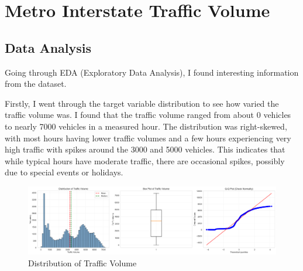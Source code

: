 \documentclass[12pt]{article}
\begin{document}
\section{Metro Interstate Traffic Volume}

\subsection{Data Analysis}

Going through EDA (Exploratory Data Analysis), I found interesting information from the dataset.

Firstly, I went through the target variable distribution to see how varied the traffic volume was. I found that the traffic volume
ranged from about 0 vehicles to nearly 7000 vehicles in a measured hour. The distribution was right-skewed, with most hours having lower traffic volumes and a few hours
experiencing very high traffic with spikes around the 3000 and 5000 vehicles. This indicates that while typical hours have moderate traffic, there are occasional spikes, possibly due to special events or holidays. 

\begin{figure}[H]
    \centering
    \includegraphics[width=1\textwidth]{images/eda_target_distribution.png}
    \caption{Distribution of Traffic Volume}
    \label{fig:eda_target_distribution}
\end{figure}
\end{document}

